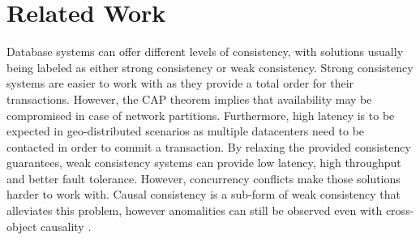 \documentclass{vldb}
\newcommand{\grumbler}[2]{{\color{red}{\bf #1:} #2}}
\renewcommand{\grumbler}[2]{}
\newcommand{\andre}[1]{\grumbler{andre}{#1}}
\begin{document}
%
%
%
%

\section{Related Work}



Database systems can offer different levels of consistency, with solutions usually being labeled as either strong consistency or weak consistency.
Strong consistency systems \cite{spanner, slog, scatter, krikellas2010strongly, redblue, megastore} are easier to work with as they provide a total order for their transactions.
However, the CAP theorem \cite{cap} implies that availability may be compromised in case of network partitions. Furthermore, high latency is to be expected in geo-distributed scenarios as multiple datacenters need to be contacted in order to commit a transaction.
By relaxing the provided consistency guarantees, weak consistency systems \cite{dynamo, couchDB, cassandra, chainreaction, cops, riak} can provide low latency, high throughput and better fault tolerance.
However, concurrency conflicts make those solutions harder to work with.
Causal consistency is a sub-form of weak consistency that alleviates this problem, however anomalities can still be observed even with cross-object causality \cite{cops, burckhardt2013understanding}.
\end{document}
